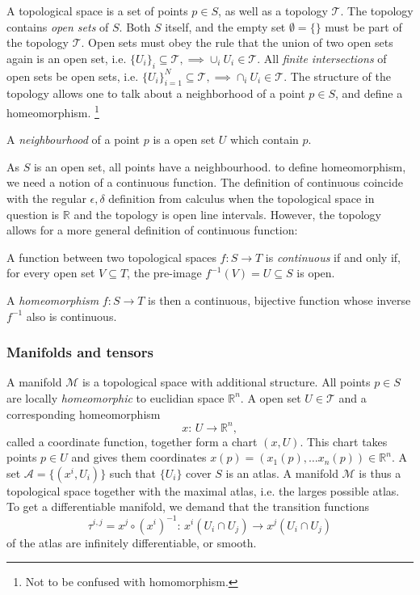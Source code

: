 A topological space is a set of points $p \in S$, as well as a topology $\mathcal{T}$.
The topology contains \emph{open sets} of $S$.
Both $S$ itself, and the empty set $\emptyset = \{\}$ must be part of the topology $\mathcal{T}$.
Open sets must obey the rule that the union of two open sets again is an open set, i.e. $\{U_i\}_i \subseteq \mathcal{T}, \implies \cup_i U_i \in \mathcal{T}$.
All \emph{finite intersections} of open sets be open sets, i.e. $\{U_i\}_{i=1}^N \subseteq \mathcal{T}, \implies \cap_i U_i \in \mathcal{T}$. 
The structure of the topology allows one to talk about a neighborhood of a point $p \in S$, and define a homeomorphism. \footnote{Not to be confused with homomorphism.}
\begin{definition}
    A \emph{neighbourhood} of a point $p$ is a open set $U$ which contain $p$.    
\end{definition}
As $S$ is an open set, all points have a neighbourhood. to define homeomorphism, we need a notion of a continuous function. 
The definition of continuous coincide with the regular $\epsilon, \delta$ definition from calculus when the topological space in question is $\mathbb{R}$ and the topology is open line intervals.
However, the topology allows for a more general definition of continuous function:
\begin{definition}
    A function between two topological spaces $f: S \rightarrow T$ is \emph{continuous} if and only if, for every open set $V \subseteq T$, the pre-image $f^{-1}(V) = U \subseteq S$ is open.
\end{definition}
\begin{definition}
    A \emph{homeomorphism} $f: S \rightarrow T$ is then a continuous, bijective function whose inverse $f^{-1}$ also is continuous. 
\end{definition}



\subsubsection*{Manifolds and tensors}



A manifold $\mathcal{M}$ is a topological space with additional structure. All points $p \in S$ are locally \emph{homeomorphic} to euclidian space $\mathbb{R}^n$. A open set $U \in \mathcal{T}$ and a corresponding homeomorphism
\begin{equation*}
    x: \, U \longrightarrow \mathbb{R}^n,
\end{equation*}
called a coordinate function, together form a chart $(x, U)$.
This chart takes points $p \in U$ and gives them coordinates $x(p) = (x_1(p), \dots x_n(p)) \in \mathbb{R}^n$.
A set $\mathcal{A} = \{(x^i, U_i)\}$ such that $\{U_i\}$ cover $S$ is an atlas.
A manifold $\mathcal{M}$ is thus a topological space together with the maximal atlas, i.e. the larges possible atlas.
To get a differentiable manifold, we demand that the transition functions
\begin{equation*}
    \tau^{i,j} = x^j \circ (x^i)^{-1}: \, x^i(U_i \cap U_j) \longrightarrow x^j(U_i \cap U_j)
\end{equation*}
of the atlas are infinitely differentiable, or smooth.

